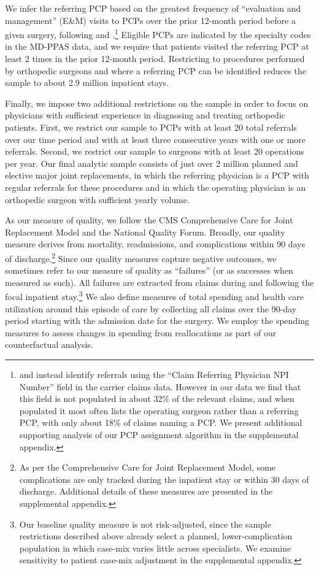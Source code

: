 \documentclass[12pt]{article}
\begin{document}
We infer the referring PCP based on the greatest frequency of ``evaluation and management'' (E\&M) visits to PCPs over the prior 12-month period before a given surgery, following \cite{pham2009} and \cite{agha2017}.\footnote{\cite{zeltzer2020} and \cite{sarsons2023} instead identify referrals using the ``Claim Referring Physician NPI Number'' field in the carrier claims data. However in our data we find that this field is not populated in about 32\% of the relevant claims, and when populated it most often lists the operating surgeon rather than a referring PCP, with only about 18\% of claims naming a PCP. We present additional supporting analysis of our PCP assignment algorithm in the supplemental appendix.} Eligible PCPs are indicated by the specialty codes in the MD-PPAS data, and we require that patients visited the referring PCP at least 2 times in the prior 12-month period. Restricting to procedures performed by orthopedic surgeons and where a referring PCP can be identified reduces the sample to about 2.9 million inpatient stays.

Finally, we impose two additional restrictions on the sample in order to focus on physicians with sufficient experience in diagnosing and treating orthopedic patients. First, we restrict our sample to PCPs with at least 20 total referrals over our time period and with at least three consecutive years with one or more referrals. Second, we restrict our sample to surgeons with at least 20 operations per year. Our final analytic sample consists of just over 2 million planned and elective major joint replacements, in which the referring physician is a PCP with regular referrals for these procedures and in which the operating physician is an orthopedic surgeon with sufficient yearly volume.

As our measure of quality, we follow the CMS Comprehensive Care for Joint Replacement Model and the National Quality Forum. Broadly, our quality measure derives from mortality, readmissions, and complications within 90 days of discharge.\footnote{As per the Comprehensive Care for Joint Replacement Model, some complications are only tracked during the inpatient stay or within 30 days of discharge. Additional details of these measures are presented in the supplemental appendix.} Since our quality measures capture negative outcomes, we sometimes refer to our measure of quality as ``failures'' (or as successes when measured as such). All failures are extracted from claims during and following the focal inpatient stay.\footnote{Our baseline quality measure is not risk-adjusted, since the sample restrictions described above already select a planned, lower-complication population in which case-mix varies little across specialists. We examine sensitivity to patient case-mix adjustment in the supplemental appendix.} We also define measures of total spending and health care utilization around this episode of care by collecting all claims over the 90-day period starting with the admission date for the surgery. We employ the spending measures to assess changes in spending from reallocations as part of our counterfactual analysis.
\end{document}

